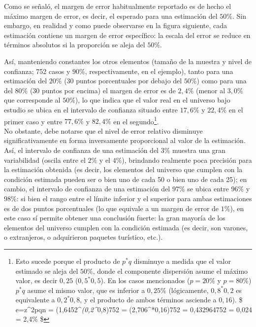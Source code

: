 \documentclass[
]{book}
\begin{document}
Como se señaló, el margen de error habitualmente reportado es de hecho el máximo margen de error, es decir, el esperado para una estimación del \(50\%\). Sin embargo, en realidad y como puede observarse en la figura siguiente, cada estimación contiene un margen de error específico: la escala del error se reduce en términos absolutos si la proporción se aleja del \(50\%\).

Así, manteniendo constantes los otros elementos (tamaño de la muestra y nivel de confianza; 752 casos y \(90\%\), respectivamente, en el ejemplo), tanto para una estimación del \(20\%\) (30 puntos porcentuales por debajo del \(50\%\)) como para una del \(80\%\) (30 puntos por encima) el margen de error es de \(2,4\%\) (menor al \(3,0\%\) que corresponde al \(50\%\)), lo que indica que el valor real en el universo bajo estudio se ubica en el intervalo de confianza situado entre \(17,6\%\) y \(22,4\%\) en el primer caso y entre \(77,6\%\) y \(82,4\%\) en el segundo\footnote{Esto sucede porque el producto de \(p^*q\) disminuye a medida que el valor estimado se aleja del \(50\%\), donde el componente dispersión asume el máximo valor, es decir \(0,25\) (\(0,5^*0,5\)). En los casos mencionados (\(p=20\%\) y \(p=80\%\)) \(p^*q\) asume el mismo valor, que es inferior a \(0,25\%\) (lógicamente, \(0,8^*0,2\) es equivalente a \(0,2^*0,8\), y el producto de ambos términos asciende a \(0,16\)). \$ e=z\^{}2pqn = (1,6452\^{}\emph{(0,2\^{}}0,8)752 = (2,706\^{}*0,16)752 = 0,432964752 = 0,024 = 2,4\% \$}.\\

No obstante, debe notarse que el nivel de error relativo disminuye significativamente en forma inversamente proporcional al valor de la estimación. Así, el intervalo de confianza de una estimación del \(3\%\) muestra una gran variabilidad (oscila entre el \(2\%\) y el \(4\%\)), brindando realmente poca precisión para la estimación obtenida (es decir, los elementos del universo que cumplen con la condición estimada pueden ser o bien uno de cada 50 o bien uno de cada 25); en cambio, el intervalo de confianza de una estimación del \(97\%\) se ubica entre \(96\%\) y \(98\%\): si bien el rango entre el límite inferior y el superior para ambas estimaciones es de dos puntos porcentuales (lo que equivale a un margen de error de \(1\%\)), en este caso sí permite obtener una conclusión fuerte: la gran mayoría de los elementos del universo cumplen con la condición estimada (es decir, son varones, o extranjeros, o adquirieron paquetes turístico, etc.).
\end{document}
